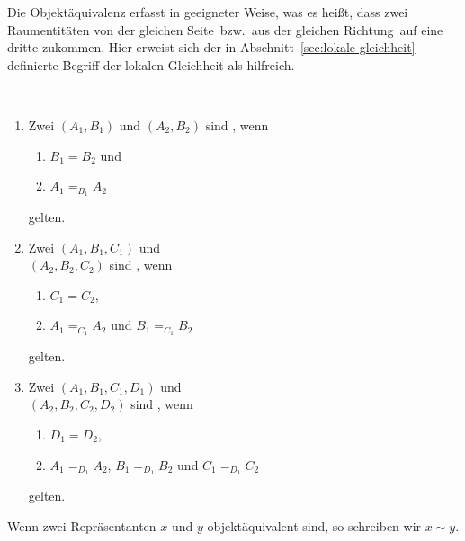 %
%
    Die Objektäquivalenz erfasst in geeigneter Weise, was es heißt, dass zwei Raumentitäten \glqq von der gleichen Seite\grqq\ bzw.\ \glqq aus der gleichen Richtung\grqq\ auf eine dritte zukommen. 
    Hier erweist sich der in Abschnitt~\ref{sec:lokale-gleichheit} definierte Begriff der lokalen Gleichheit als hilfreich.
%
    \begin{dfn}\label{dfn:objektaequivalenz}\ \vspace{0pt}

        \begin{enumerate}
            \item Zwei  $(A_1,B_1)$ und $(A_2,B_2)$ sind , wenn 
                \begin{enumerate}
                    \item $B_1 = B_2$ und
                    \item $A_1 =_{B_1} A_2$
                \end{enumerate}
                gelten.
            \item Zwei  $(A_1,B_1,C_1)$ und \\
            $(A_2,B_2,C_2)$ sind , wenn 
                \begin{enumerate}
                    \item $C_1 = C_2$,
                    \item $A_1 =_{C_1} A_2$ und $B_1 =_{C_1} B_2$
                \end{enumerate}
                gelten.
            \item Zwei  $(A_1,B_1,C_1,D_1)$ und\\
                $(A_2,B_2,C_2,D_2)$ sind , wenn 
                \begin{enumerate}
                    \item $D_1 = D_2$,
                    \item $A_1 =_{D_1} A_2$, $B_1 =_{D_1} B_2$ und $C_1 =_{D_1} C_2$
                \end{enumerate}	
                gelten.		
        \end{enumerate}
        
        Wenn zwei Repräsentanten $x$ und $y$ objektäquivalent sind, so schreiben wir $x \sim y$.
        
    \end{dfn}
